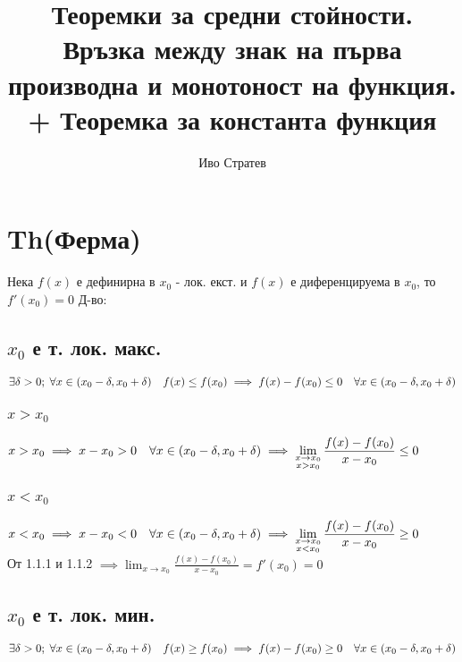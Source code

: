 \documentclass{article}
\title{Теоремки за средни стойности. Връзка между знак на първа производна и монотоност на функция. + Теоремка за константа функция}
\author{Иво Стратев}
\newcommand{\spc}[0]{\quad}
\begin{document}
    \maketitle

    \section{Th(Ферма)}
    Нека \(f(x)\) е дефинирна в \(x_0\) - лок. екст. и \(f(x)\) е диференцируема в \(x_0\), то \(f'(x_0) = 0\)
    \bigbreak
    Д-во:

    \subsection{\(x_0\) е т. лок. макс.}
    \(\exists \delta > 0; \; \forall x \in (x_0 - \delta, x_0 + \delta) \spc f(x) \leq f(x_0)\\
    \implies f(x) - f(x_0) \leq 0 \spc \forall x \in (x_0 - \delta, x_0 + \delta)\)
    \subsubsection{\(x > x_0\)}
    \(x > x_0 \implies x - x_0 > 0 \spc \forall x \in (x_0 - \delta, x_0 + \delta)\\
    \implies \displaystyle\lim\limits_{\substack{x \to x_0 \\ x > x_0}} \frac{f(x) - f(x_0)}{x - x_0} \leq 0\)
    \subsubsection{\(x < x_0\)}
    \(x < x_0 \implies x - x_0 < 0 \spc \forall x \in (x_0 - \delta, x_0 + \delta)\\
    \implies \displaystyle\lim\limits_{\substack{x \to x_0 \\ x < x_0}} \frac{f(x) - f(x_0)}{x - x_0} \geq 0\)\\
    От 1.1.1 и 1.1.2 \(\implies \displaystyle\lim_{x \to x_0} \frac{f(x) - f(x_0)}{x - x_0} = f'(x_0) = 0\)

    \subsection{\(x_0\) е т. лок. мин.}
    \(\exists \delta > 0; \; \forall x \in (x_0 - \delta, x_0 + \delta) \spc f(x) \geq f(x_0)\\
    \implies f(x) - f(x_0) \geq 0 \spc \forall x \in (x_0 - \delta, x_0 + \delta)\)
\end{document}
